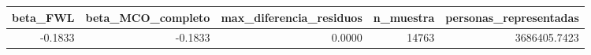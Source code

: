 \begin{tabular}{rrrrr}
\toprule
beta\_FWL & beta\_MCO\_completo & max\_diferencia\_residuos & n\_muestra & personas\_representadas \\
\midrule
-0.1833 & -0.1833 & 0.0000 & 14763 & 3686405.7423 \\
\bottomrule
\end{tabular}
